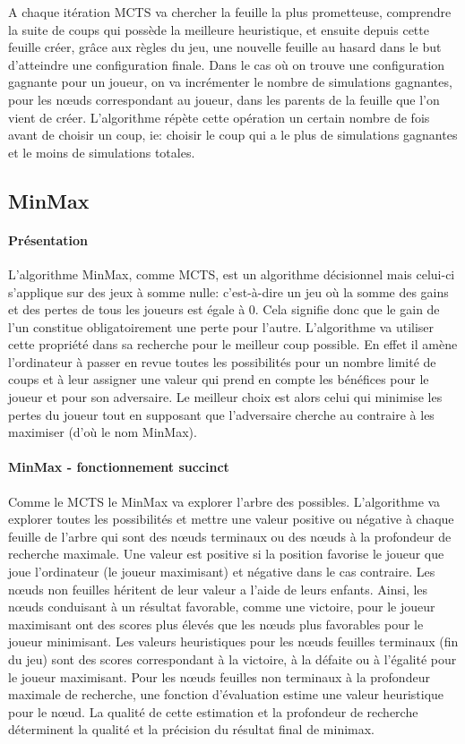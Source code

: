 A chaque itération MCTS va chercher la feuille la plus prometteuse, comprendre la suite de coups qui possède la meilleure heuristique, 
et ensuite depuis cette feuille créer, grâce aux règles du jeu, une nouvelle feuille au hasard dans le but d'atteindre une configuration finale.
Dans le cas où on trouve une configuration gagnante pour un joueur, on va incrémenter le nombre de simulations gagnantes, pour les nœuds
correspondant au joueur, dans les parents de la feuille que l'on vient de créer.
L'algorithme répète cette opération un certain nombre de fois avant de choisir un coup, ie: choisir le coup qui a le plus de simulations
gagnantes et le moins de simulations totales.



\subsection{MinMax}

\paragraph{Présentation}
L'algorithme MinMax, comme MCTS, est un algorithme décisionnel mais celui-ci s'applique sur des jeux à somme nulle: c'est-à-dire
un jeu où la somme des gains et des pertes de tous les joueurs est égale à 0. Cela signifie donc que le gain de l'un constitue 
obligatoirement une perte pour l'autre. L'algorithme va utiliser cette propriété dans sa recherche pour le meilleur coup possible.
En effet il amène l'ordinateur à passer en revue toutes les possibilités pour un nombre limité de coups et à leur assigner une valeur 
qui prend en compte les bénéfices pour le joueur et pour son adversaire. Le meilleur choix est alors celui qui minimise les pertes 
du joueur tout en supposant que l'adversaire cherche au contraire à les maximiser (d'où le nom MinMax).

\paragraph{MinMax - fonctionnement succinct}
Comme le MCTS le MinMax va explorer l'arbre des possibles. L'algorithme va explorer toutes les possibilités et mettre une valeur positive ou négative
à chaque feuille de l'arbre qui sont des nœuds terminaux ou des nœuds à la profondeur de recherche maximale.
Une valeur est positive si la position favorise le joueur que joue l'ordinateur (le joueur maximisant) et négative dans le cas contraire.
Les nœuds non feuilles héritent de leur valeur a l'aide de leurs enfants.
Ainsi, les nœuds conduisant à un résultat favorable, comme une victoire, pour le joueur maximisant ont des scores plus élevés que les nœuds 
plus favorables pour le joueur minimisant. Les valeurs heuristiques pour les nœuds feuilles terminaux (fin du jeu) sont des scores correspondant 
à la victoire, à la défaite ou à l'égalité pour le joueur maximisant. Pour les nœuds feuilles non terminaux à la profondeur maximale de recherche, 
une fonction d'évaluation estime une valeur heuristique pour le nœud. La qualité de cette estimation et la profondeur de recherche déterminent la 
qualité et la précision du résultat final de minimax.